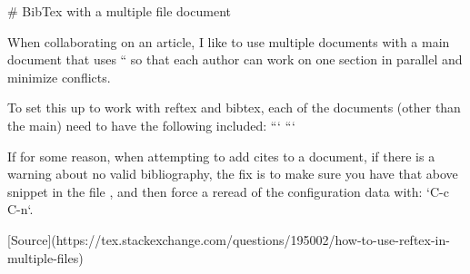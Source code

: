 # BibTex with a multiple file document 

 When collaborating on an article, I like to use multiple documents with a main document that uses `` so that each author can work on one section in parallel and minimize conflicts.
 
 To set this up to work with reftex and bibtex, each of the documents (other than the main) need to have the following included:
 ```
 ```
 
 If for some reason, when attempting to add cites to a document, if there is a warning about no valid bibliography, the fix is to make sure you have that above snippet in the file , and then force a reread of the configuration data with:
 `C-c C-n`.
 
 [Source](https://tex.stackexchange.com/questions/195002/how-to-use-reftex-in-multiple-files)
